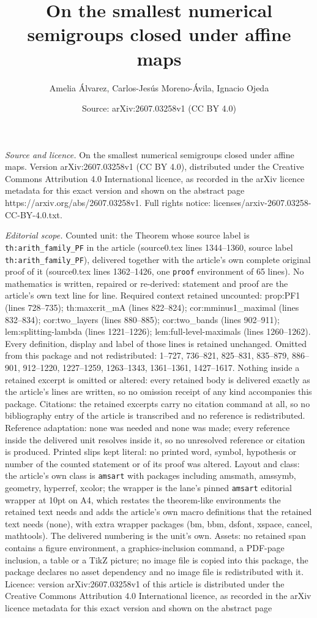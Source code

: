 \documentclass[10pt,a4paper]{amsart}
\title[On the smallest numerical semigroups closed under affine map]{On the smallest numerical semigroups closed under affine maps}
\author{Amelia \'Alvarez, Carlos-Jes\'us Moreno-\'Avila, Ignacio Ojeda}
\date{Source: arXiv:2607.03258v1 (CC BY 4.0)}
\begin{document}
\maketitle

\noindent\emph{Source and licence.} On the smallest numerical semigroups closed under affine maps. Version arXiv:2607.03258v1 (CC BY 4.0), distributed under the Creative Commons Attribution 4.0 International licence, as recorded in the arXiv licence metadata for this exact version and shown on the abstract page https://arxiv.org/abs/2607.03258v1. Full rights notice: licenses/arxiv-2607.03258-CC-BY-4.0.txt.\par\smallskip

\noindent\textit{Editorial scope.} Counted unit: the Theorem whose source label is \texttt{th:arith\_family\_PF} in the article (source0.tex lines 1344--1360, source label \texttt{th:arith\_family\_PF}), delivered together with the article's own complete original proof of it (source0.tex lines 1362--1426, one \texttt{proof} environment of 65 lines). No mathematics is written, repaired or re-derived: statement and proof are the article's own text line for line. Required context retained uncounted: prop:PF1 (lines 728--735); th:maxcrit\_mA (lines 822--824); cor:mminus1\_maximal (lines 832--834); cor:two\_layers (lines 880--885); cor:two\_bands (lines 902--911); lem:splitting-lambda (lines 1221--1226); lem:full-level-maximals (lines 1260--1262). Every definition, display and label of those lines is retained unchanged. Omitted from this package and not redistributed: 1--727, 736--821, 825--831, 835--879, 886--901, 912--1220, 1227--1259, 1263--1343, 1361--1361, 1427--1617. Nothing inside a retained excerpt is omitted or altered: every retained body is delivered exactly as the article's lines are written, so no omission receipt of any kind accompanies this package. Citations: the retained excerpts carry no citation command at all, so no bibliography entry of the article is transcribed and no reference is redistributed. Reference adaptation: none was needed and none was made; every reference inside the delivered unit resolves inside it, so no unresolved reference or citation is produced. Printed slips kept literal: no printed word, symbol, hypothesis or number of the counted statement or of its proof was altered. Layout and class: the article's own class is \texttt{amsart} with packages including amsmath, amssymb, geometry, hyperref, xcolor; the wrapper is the lane's pinned \texttt{amsart} editorial wrapper at 10pt on A4, which restates the theorem-like environments the retained text needs and adds the article's own macro definitions that the retained text needs (none), with extra wrapper packages (bm, bbm, dsfont, xspace, cancel, mathtools). The delivered numbering is the unit's own. Assets: no retained span contains a figure environment, a graphics-inclusion command, a PDF-page inclusion, a table or a TikZ picture; no image file is copied into this package, the package declares no asset dependency and no image file is redistributed with it. Licence: version arXiv:2607.03258v1 of this article is distributed under the Creative Commons Attribution 4.0 International licence, as recorded in the arXiv licence metadata for this exact version and shown on the abstract page 
\end{document}
